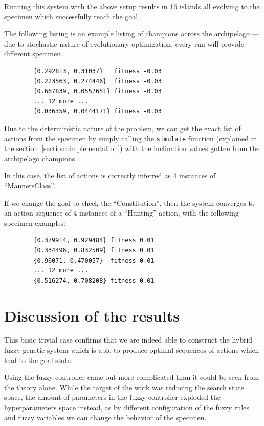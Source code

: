 \documentclass[12pt, a4paper]{report}
\begin{document}
	Running this system with the above setup results in 16 islands all evolving to the specimen which successfully reach the goal.
	
	The following listing is an example listing of champions across the archipelago --- due to stochastic nature of evolutionary optimization, every run will provide different specimen.
	
	\begin{verbatim}
		{0.292813, 0.31037}   fitness -0.03
		{0.223563, 0.274446}  fitness -0.03
		{0.667839, 0.0552651} fitness -0.03
		... 12 more ...
		{0.036359, 0.0444171} fitness -0.03
	\end{verbatim}
	
	Due to the deterministic nature of the problem, we can get the exact list of actions from the specimen by simply calling the \texttt{simulate} function (explained in the section~\ref{section::implementation}) with the inclination values gotten from the archipelago champions.
	
	In this case, the list of actions is correctly inferred as 4 instances of ``MannersClass''.
	
	If we change the goal to check the ``Constitution'', then the system converges to an action sequence of 4 instances of a ``Hunting'' action, with the following specimen examples:
	
	\begin{verbatim}
		{0.379914, 0.929484} fitness 0.01
		{0.334496, 0.832509} fitness 0.01
		{0.96071, 0.470057}  fitness 0.01
		... 12 more ...
		{0.516274, 0.708208} fitness 0.01
	\end{verbatim}
	
	
	\section{Discussion of the results}
		
	This basic trivial case confirms that we are indeed able to construct the hybrid fuzzy-genetic system which is able to produce optimal sequences of actions which lead to the goal state.
		
	Using the fuzzy controller came out more complicated than it could be seen from the theory alone.
	While the target of the work was reducing the search state space, the amount of parameters in the fuzzy controller exploded the hyperparameters space instead, as by different configuration of the fuzzy rules and fuzzy variables we can change the behavior of the specimen.
	
\end{document}
